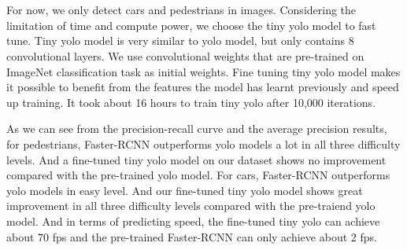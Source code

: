 \section{}

For now, we only detect cars and pedestrians in images. Considering the limitation of time and compute power, we choose the tiny yolo model to fast tune. Tiny yolo model is very similar to yolo model, but only contains 8 convolutional layers. We use convolutional weights that are pre-trained on ImageNet classification task as initial weights. Fine tuning tiny yolo model makes it possible to benefit from the features the model has learnt previously and speed up training. It took about 16 hours to train tiny yolo after 10,000 iterations.





As we can see from the precision-recall curve and the average precision results, for pedestrians, Faster-RCNN outperforms yolo models a lot in all three difficulty levels. And a fine-tuned tiny yolo model on our dataset shows no improvement compared with the pre-trained yolo model. For cars, Faster-RCNN outperforms yolo models in easy level. And our fine-tuned tiny yolo model shows great improvement in all three difficulty levels compared with the pre-traiend yolo model. And
in terms of predicting speed, the fine-tuned tiny yolo can achieve about 70 fps and the pre-trained Faster-RCNN can only achieve about 2 fps.